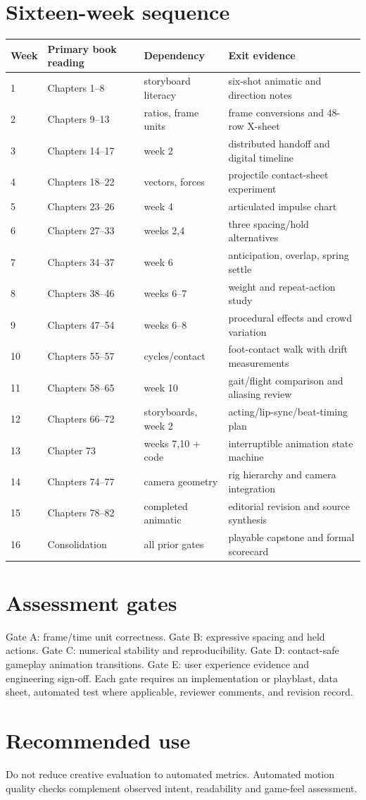 \documentclass[10pt,letterpaper]{article}
\begin{document}
\section{Sixteen-week sequence}
\begin{longtable}{p{.1\linewidth}p{.3\linewidth}p{.23\linewidth}p{.26\linewidth}}
\textbf{Week}&\textbf{Primary book reading}&\textbf{Dependency}&\textbf{Exit evidence}\\\hline
1 & Chapters 1--8 & storyboard literacy & six-shot animatic and direction notes\\
2 & Chapters 9--13 & ratios, frame units & frame conversions and 48-row X-sheet\\
3 & Chapters 14--17 & week 2 & distributed handoff and digital timeline\\
4 & Chapters 18--22 & vectors, forces & projectile contact-sheet experiment\\
5 & Chapters 23--26 & week 4 & articulated impulse chart\\
6 & Chapters 27--33 & weeks 2,4 & three spacing/hold alternatives\\
7 & Chapters 34--37 & week 6 & anticipation, overlap, spring settle\\
8 & Chapters 38--46 & weeks 6--7 & weight and repeat-action study\\
9 & Chapters 47--54 & weeks 6--8 & procedural effects and crowd variation\\
10 & Chapters 55--57 & cycles/contact & foot-contact walk with drift measurements\\
11 & Chapters 58--65 & week 10 & gait/flight comparison and aliasing review\\
12 & Chapters 66--72 & storyboards, week 2 & acting/lip-sync/beat-timing plan\\
13 & Chapter 73 & weeks 7,10 + code & interruptible animation state machine\\
14 & Chapters 74--77 & camera geometry & rig hierarchy and camera integration\\
15 & Chapters 78--82 & completed animatic & editorial revision and source synthesis\\
16 & Consolidation & all prior gates & playable capstone and formal scorecard\\
\end{longtable}
\section{Assessment gates}
Gate A: frame/time unit correctness. Gate B: expressive spacing and held actions. Gate C: numerical stability and reproducibility. Gate D: contact-safe gameplay animation transitions. Gate E: user experience evidence and engineering sign-off. Each gate requires an implementation or playblast, data sheet, automated test where applicable, reviewer comments, and revision record.
\section{Recommended use}
Do not reduce creative evaluation to automated metrics. Automated motion quality checks complement observed intent, readability and game-feel assessment.
\end{document}
